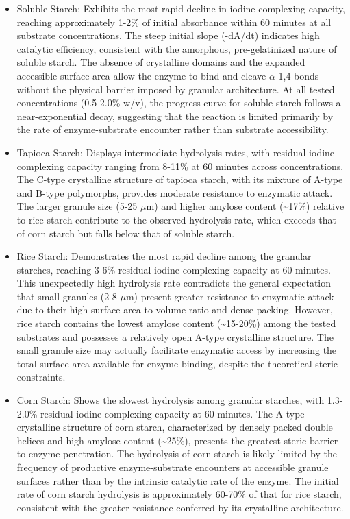 \documentclass[
  12pt,
]{article}
\begin{document}
\begin{itemize}
\item
  Soluble Starch: Exhibits the most rapid decline in iodine-complexing
  capacity, reaching approximately 1-2\% of initial absorbance within 60
  minutes at all substrate concentrations. The steep initial slope
  (-dA/dt) indicates high catalytic efficiency, consistent with the
  amorphous, pre-gelatinized nature of soluble starch. The absence of
  crystalline domains and the expanded accessible surface area allow the
  enzyme to bind and cleave \(\alpha\)-1,4 bonds without the physical
  barrier imposed by granular architecture. At all tested concentrations
  (0.5-2.0\% w/v), the progress curve for soluble starch follows a
  near-exponential decay, suggesting that the reaction is limited
  primarily by the rate of enzyme-substrate encounter rather than
  substrate accessibility.
\item
  Tapioca Starch: Displays intermediate hydrolysis rates, with residual
  iodine-complexing capacity ranging from 8-11\% at 60 minutes across
  concentrations. The C-type crystalline structure of tapioca starch,
  with its mixture of A-type and B-type polymorphs, provides moderate
  resistance to enzymatic attack. The larger granule size (5-25
  \(\mu\)m) and higher amylose content (\textasciitilde17\%) relative to
  rice starch contribute to the observed hydrolysis rate, which exceeds
  that of corn starch but falls below that of soluble starch.
\item
  Rice Starch: Demonstrates the most rapid decline among the granular
  starches, reaching 3-6\% residual iodine-complexing capacity at 60
  minutes. This unexpectedly high hydrolysis rate contradicts the
  general expectation that small granules (2-8 \(\mu\)m) present greater
  resistance to enzymatic attack due to their high
  surface-area-to-volume ratio and dense packing. However, rice starch
  contains the lowest amylose content (\textasciitilde15-20\%) among the
  tested substrates and possesses a relatively open A-type crystalline
  structure. The small granule size may actually facilitate enzymatic
  access by increasing the total surface area available for enzyme
  binding, despite the theoretical steric constraints.
\item
  Corn Starch: Shows the slowest hydrolysis among granular starches,
  with 1.3-2.0\% residual iodine-complexing capacity at 60 minutes. The
  A-type crystalline structure of corn starch, characterized by densely
  packed double helices and high amylose content (\textasciitilde25\%),
  presents the greatest steric barrier to enzyme penetration. The
  hydrolysis of corn starch is likely limited by the frequency of
  productive enzyme-substrate encounters at accessible granule surfaces
  rather than by the intrinsic catalytic rate of the enzyme. The initial
  rate of corn starch hydrolysis is approximately 60-70\% of that for
  rice starch, consistent with the greater resistance conferred by its
  crystalline architecture.
\end{itemize}
\end{document}
